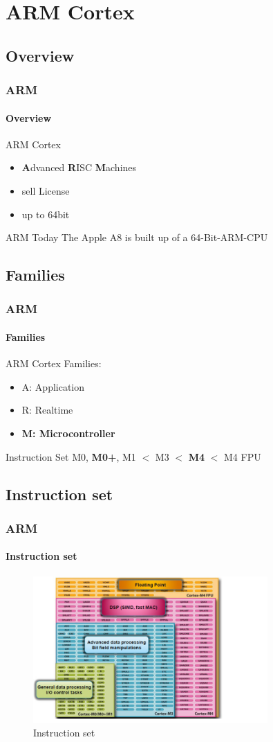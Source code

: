 \section{ARM Cortex}
\subsection{Overview}
\begin{frame}
    \frametitle{ARM}
    \framesubtitle{Overview}
    ARM Cortex
    \begin{itemize}
        \item \textbf{A}dvanced \textbf{R}ISC \textbf{M}achines
        \item sell License
        \item up to 64bit
    \end{itemize}
    \begin{block}{ARM Today}
		The Apple A8 is built up of a 64-Bit-ARM-CPU
    \end{block}
\end{frame}

\subsection{Families}
\begin{frame}
    \frametitle{ARM}
    \framesubtitle{Families}
   ARM Cortex Families:
    \begin{itemize}
        \item A: Application
        \item R: Realtime
        \item \textbf{M: Microcontroller}
    \end{itemize}
    \begin{block}{Instruction Set}
       M0,\textbf{ M0+}, M1 $<$  M3 $<$  \textbf{M4} $<$ M4 FPU
    \end{block}
\end{frame}

\subsection{Instruction set}
\begin{frame}
    \frametitle{ARM}
    \framesubtitle{Instruction set}
    \begin{figure}
        \includegraphics[width=0.8\textwidth]			{fig/instructionset.png}
        \caption{Instruction set}
    \end{figure}
\end{frame}

